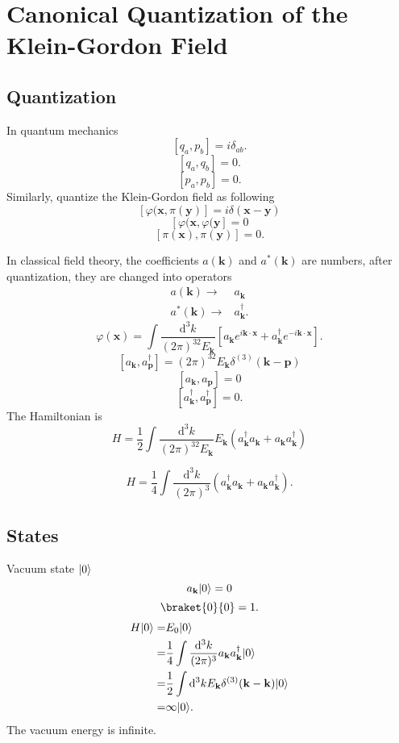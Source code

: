 \section{Canonical Quantization of the Klein-Gordon Field}
\subsection{Quantization}
In quantum mechanics
\[
\left[ q_a,p_b \right] =i\delta_{ab}
.\] 
\[
\left[ q_a,q_b \right] =0
.\] 
\[
\left[ p_a,p_b \right] =0
.\]
Similarly, quantize the Klein-Gordon field as following
\[
  \left[ \varphi(\mathbf{x},\pi(\mathbf{y}) \right] =i\delta(\mathbf{x}-\mathbf{y})
\] 
\[
  \left[ \varphi(\mathbf{x},\varphi(\mathbf{y} \right]=0 
\]
\[
  \left[ \pi(\mathbf{x}),\pi(\mathbf{y}) \right] =0
.\] 

In classical field theory, the coefficients $a(\mathbf{k})$ and $a^*(\mathbf{k})$ are numbers, after quantization, they are changed into operators
\begin{align*}
  a(\mathbf{k})\to &a_{\mathbf{k}}\\
  a^*(\mathbf{k})\to &a^\dagger_{\mathbf{k}}
.\end{align*}
\[
  \varphi(\mathbf{x})=\int \frac{\mathrm{d}^3k}{(2\pi)^32E_{\mathbf{k}}}\left[ a_{\mathbf{k}}e^{i\mathbf{k}\cdot \mathbf{x}}+a^\dagger_{\mathbf{k}}e^{-i\mathbf{k}\cdot \mathbf{x}} \right] 
.\] 
\[
  \left[ a_{\mathbf{k}},a_{\mathbf{p}}^\dagger \right] =(2\pi)^32E_{\mathbf{k}}\delta^{(3)}(\mathbf{k}-\mathbf{p})
\]
\[
  \left[ a_{\mathbf{k}},a_{\mathbf{p}} \right] =0
\]
\[
  \left[ a_{\mathbf{k}}^{\dagger},a_{\mathbf{p}}^{\dagger} \right] =0.
\]
The Hamiltonian is 
\[
  H=\frac{1}{2}\int \frac{\mathrm{d}^3k}{(2\pi)^32E_{\mathbf{k}}}E_{\mathbf{k}}\left( a_{\mathbf{k}}^{\dagger}a_{\mathbf{k}}+a_{\mathbf{k}}a_{\mathbf{k}}^{\dagger} \right) 
\]

\[
  H=\frac{1}{4}\int \frac{\mathrm{d}^3k}{(2\pi)^3}\left( a_{\mathbf{k}}^{\dagger}a_{\mathbf{k}}+a_{\mathbf{k}}a_{\mathbf{k}}^{\dagger} \right) 
.\] 
\subsection{States}
Vacuum state $\lvert0\rangle$
\[
a_{\mathbf{k}}\lvert0\rangle=0
\] 
\[
\braket{0}{0}=1
.\] 
\begin{align*}
  H\lvert0\rangle=&E_0\lvert0\rangle\\
  =&\frac{1}{4}\int \frac{\mathrm{d}^{3}k}{(2\pi)^3}a_{\mathbf{k}}a_{\mathbf{k}}^{\dagger}\lvert0\rangle\\
  =&\frac{1}{2}\int \mathrm{d}^3kE_{\mathbf{k}}\delta^{(3)}(\mathbf{k}-\mathbf{k})\lvert0\rangle\\
  =&\infty\lvert0\rangle
.\end{align*}
The vacuum energy is infinite.

